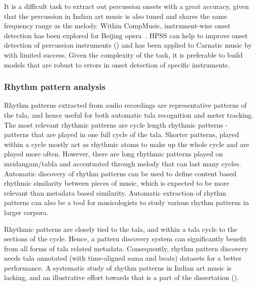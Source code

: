 It is a difficult task to extract out percussion onsets with a great accuracy, given that the percussion in Indian art music is also tuned and shares the same frequency range as the melody. Within CompMusic, instrument-wise onset detection has been explored for Beijing opera~\cite{tian:14:icassp}. \Gls{HPSS} can help to improve onset detection of percussion instruments () and has been applied to Carnatic music by  with limited success. Given the complexity of the task, it is preferable to build models that are robust to errors in onset detection of specific instruments. 
%
\subsubsection{Rhythm pattern analysis}
Rhythm patterns extracted from audio recordings are representative patterns of the \gls{tala}, and hence useful for both automatic \gls{tala} recognition and meter tracking. The most relevant rhythmic patterns are cycle length rhythmic patterns - patterns that are played in one full cycle of the \gls{tala}. Shorter patterns, played within a cycle mostly act as rhythmic atoms to make up the whole cycle and are played more often. However, there are long rhythmic patterns played on mridangam/\gls{tabla} and accentuated through melody that can last many cycles. Automatic discovery of rhythm patterns can be used to define content based rhythmic similarity between pieces of music, which is expected to be more relevant than metadata based similarity. Automatic extraction of rhythm patterns can also be a tool for musicologists to study various rhythm patterns in larger corpora. 

Rhythmic patterns are closely tied to the \gls{tala}, and within a \gls{tala} cycle to the sections of the cycle. Hence, a pattern discovery system can significantly benefit from all forms of \gls{tala} related metadata. Consequently, rhythm pattern discovery needs \gls{tala} annotated (with time-aligned \gls{sama} and beats) datasets for a better performance. A systematic study of rhythm patterns in Indian art music is lacking, and an illustrative effort towards that is a part of the dissertation (). 
%
